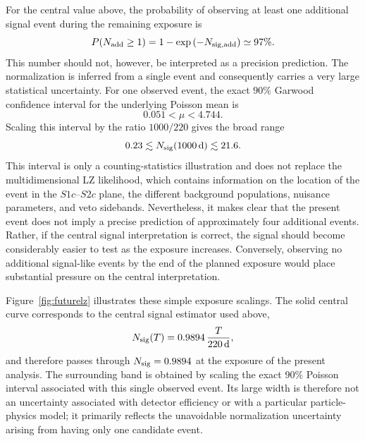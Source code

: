 \documentclass[aps,prd,reprint,superscriptaddress,nofootinbib,longbibliography,floatfix]{revtex4-2}
\begin{document}
For the central value above, the probability of observing at least one additional signal event during the remaining exposure is
\begin{equation}
P(N_{\rm add}\geq1)
=
1-\exp\left(-N_{\rm sig,add}\right)
\simeq 97\%.
\end{equation}
This number should not, however, be interpreted as a precision prediction. The normalization is inferred from a single event and consequently carries a very large statistical uncertainty. For one observed event, the exact $90\%$ Garwood confidence interval for the underlying Poisson mean is
\begin{equation}
0.051 < \mu < 4.744.
\end{equation}
Scaling this interval by the ratio $1000/220$ gives the broad range
\begin{equation}
0.23 \lesssim N_{\rm sig}(1000\,{\rm d}) \lesssim 21.6.
\end{equation}
This interval is only a counting-statistics illustration and does not replace the multidimensional LZ likelihood, which contains information on the location of the event in the $S1c$--$S2c$ plane, the different background populations, nuisance parameters, and veto sidebands. Nevertheless, it makes clear that the present event does not imply a precise prediction of approximately four additional events. Rather, if the central signal interpretation is correct, the signal should become considerably easier to test as the exposure increases. Conversely, observing no additional signal-like events by the end of the planned exposure would place substantial pressure on the central interpretation.

Figure~\ref{fig:futurelz} illustrates these simple exposure scalings. The solid central curve corresponds to the central signal estimator used above,
\begin{equation}
N_{\rm sig}(T)=0.9894\,\frac{T}{220\,{\rm d}},
\end{equation}
and therefore passes through $N_{\rm sig}=0.9894$ at the exposure of the present analysis. The surrounding band is obtained by scaling the exact $90\%$ Poisson interval associated with this single observed event. Its large width is therefore not an uncertainty associated with detector efficiency or with a particular particle-physics model; it primarily reflects the unavoidable normalization uncertainty arising from having only one candidate event.
\end{document}
